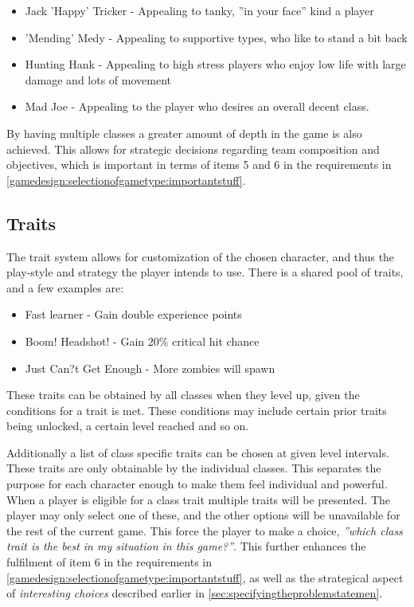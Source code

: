 \begin{itemize}
\item Jack 'Happy' Tricker - Appealing to tanky, ''in your face'' kind a player
\item 'Mending' Medy - Appealing to supportive types, who like to stand a bit back
\item Hunting Hank - Appealing to high stress players who enjoy low life with large damage and lots of movement
\item Mad Joe - Appealing to the player who desires an overall decent class. 
\end{itemize}

By having multiple classes a greater amount of depth in the game is also achieved. This allows for strategic decisions regarding team composition and objectives, which is important in terms of items 5 and 6 in the requirements in \ref{gamedesign:selectionofgametype:importantstuff}.

\subsection*{Traits}\label{gamedesign:ourgame:traits}
The trait system allows for customization of the chosen character, and thus the play-style and strategy the player intends to use.
There is a shared pool of traits, and a few examples are:
\begin{itemize}
\item Fast learner - Gain double experience points
\item Boom! Headshot!  - Gain 20\% critical hit chance
\item Just Can?t Get Enough - More zombies will spawn
\end{itemize} 
These traits can be obtained by all classes when they level up, given the conditions for a trait is met. These conditions may include certain prior traits being unlocked, a certain level reached and so on.

Additionally a list of class specific traits can be chosen at given level intervals. 
These traits are only obtainable by the individual classes. This separates the purpose for each character enough to make them feel individual and powerful. When a player is eligible for a class trait multiple traits will be presented. The player may only select one of these, and the other options will be unavailable for the rest of the current game. This force the player to make a choice, \emph{''which class trait is the best in my situation in this game?''}. 
This further enhances the fulfilment of item 6 in the requirements in \ref{gamedesign:selectionofgametype:importantstuff}, as well as the strategical aspect of \emph{interesting choices} described earlier in \ref{sec:specifyingtheproblemstatemen}.

